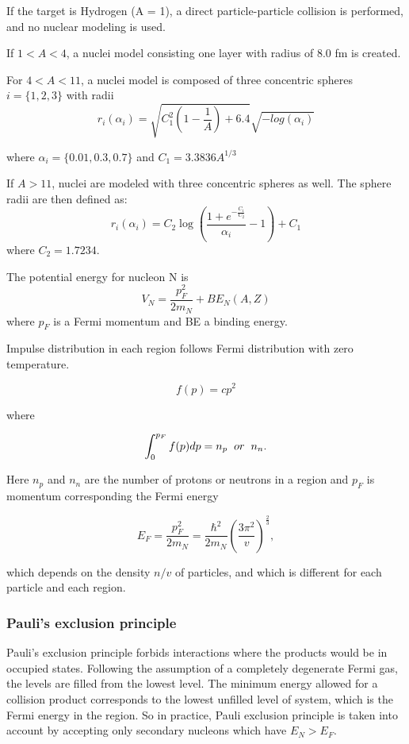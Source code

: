 \documentclass[twocolumn,twoside,slac,floatfix]{revtex4}
\begin{document}
If the target is Hydrogen (A = 1), a direct particle-particle collision is performed, and no nuclear modeling is used. 


If $1 < A < 4$, a nuclei model consisting one layer with radius of 8.0 fm is created.


For $4 < A < 11$, a nuclei model is composed of three concentric spheres $i = \{1, 2, 3\}$ with radii
$$r_{i}(\alpha_{i}) = \sqrt{C_{1}^{2} (1 - \frac{1}{A}) + 6.4} \sqrt{-log( \alpha_{i})}$$

where $\alpha_{i} = \{0.01, 0.3, 0.7\}$ and $C_{1} = 3.3836 A^{1/3}$

If $A > 11$, nuclei are modeled with three concentric spheres as well. The sphere radii are then defined as:
$$r_{i}(\alpha_{i}) =  C_{2} \log({\frac{1 + e^{- \frac{C_{1}}{C_{2}}}}{\alpha_{i}} - 1}) + C_{1}$$
where $C_{2} = 1.7234$.

The potential energy for nucleon N is
$$ V_{N} = \frac{p_{F}^2}{2 m_{N}} + BE_{N}(A, Z)$$
where $p_F$ is a Fermi momentum and BE a binding energy. 
 
Impulse distribution in each region follows Fermi distribution with zero temperature.

\begin{equation}
 f(p) = c p ^2
 \end{equation}

 where

 \begin{equation}
 \int_0^{p_F} f(p) dp = n_{p} \hspace{0.2truecm}  or \hspace{0.2truecm}   n_{n}.
 \end{equation}

 Here $n_p$ and $n_n$ are the number of protons or neutrons in a region and 
$p_F$ is momentum corresponding the Fermi energy

 \begin{equation}
 E_F = \frac{p_F^2}{2 m_N} = \frac{\hbar^2}{2 m_N}(\frac{3 \pi^{2}}{v})^\frac{2}{3},
 \end{equation}
 
 which depends on the density $n/v$ of particles, 
 and which is different for each particle and each region. 

\subsubsection{Pauli's exclusion principle}
Pauli's exclusion principle forbids interactions where the products would be in occupied states.
Following the assumption of a completely degenerate Fermi gas, the levels are filled from the lowest level.
The minimum energy allowed for a collision product corresponds to the lowest unfilled level of system, which is the Fermi energy in the region. 
So in practice, Pauli exclusion principle is taken into account by accepting only secondary nucleons which have $E_N > E_F$.
\end{document}
